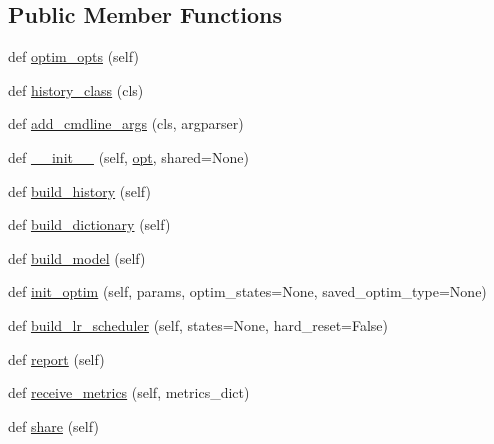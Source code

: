 \subsection*{Public Member Functions}
\begin{DoxyCompactItemize}
\item 
def \hyperlink{classparlai_1_1core_1_1torch__agent_1_1TorchAgent_a9c622b8ed5a811841f30fe98cc297cde}{optim\+\_\+opts} (self)
\item 
def \hyperlink{classparlai_1_1core_1_1torch__agent_1_1TorchAgent_a0bd9118252c602bb9d5a596ecae16717}{history\+\_\+class} (cls)
\item 
def \hyperlink{classparlai_1_1core_1_1torch__agent_1_1TorchAgent_a4a72bdd07d2cb5ce402d0058140cad0d}{add\+\_\+cmdline\+\_\+args} (cls, argparser)
\item 
def \hyperlink{classparlai_1_1core_1_1torch__agent_1_1TorchAgent_ad0a00ada1fcd5b7ceec27b1a6cbdc281}{\+\_\+\+\_\+init\+\_\+\+\_\+} (self, \hyperlink{classparlai_1_1core_1_1torch__agent_1_1TorchAgent_a785bb920cf8c8afc3e9bf6a8b77e335a}{opt}, shared=None)
\item 
def \hyperlink{classparlai_1_1core_1_1torch__agent_1_1TorchAgent_ab22f61f153b522f429210c61eed2d5af}{build\+\_\+history} (self)
\item 
def \hyperlink{classparlai_1_1core_1_1torch__agent_1_1TorchAgent_a233316f9ec2805dd6a08fbf07f3a078a}{build\+\_\+dictionary} (self)
\item 
def \hyperlink{classparlai_1_1core_1_1torch__agent_1_1TorchAgent_a9a21fa33fa5b2b928024fbc67826f233}{build\+\_\+model} (self)
\item 
def \hyperlink{classparlai_1_1core_1_1torch__agent_1_1TorchAgent_a3784f1ddaa6ffad009716910f3f36dd4}{init\+\_\+optim} (self, params, optim\+\_\+states=None, saved\+\_\+optim\+\_\+type=None)
\item 
def \hyperlink{classparlai_1_1core_1_1torch__agent_1_1TorchAgent_aa51ac42dc34e3d2281a01cba78a96151}{build\+\_\+lr\+\_\+scheduler} (self, states=None, hard\+\_\+reset=False)
\item 
def \hyperlink{classparlai_1_1core_1_1torch__agent_1_1TorchAgent_ac694770cd4022eb047bf6fbb8f46035c}{report} (self)
\item 
def \hyperlink{classparlai_1_1core_1_1torch__agent_1_1TorchAgent_a02beaaedfa30463f9d0a97ea590b516f}{receive\+\_\+metrics} (self, metrics\+\_\+dict)
\item 
def \hyperlink{classparlai_1_1core_1_1torch__agent_1_1TorchAgent_a373f0e276bf7c9d914a4e3363e9c2712}{share} (self)
\item 

\end{DoxyCompactItemize}
